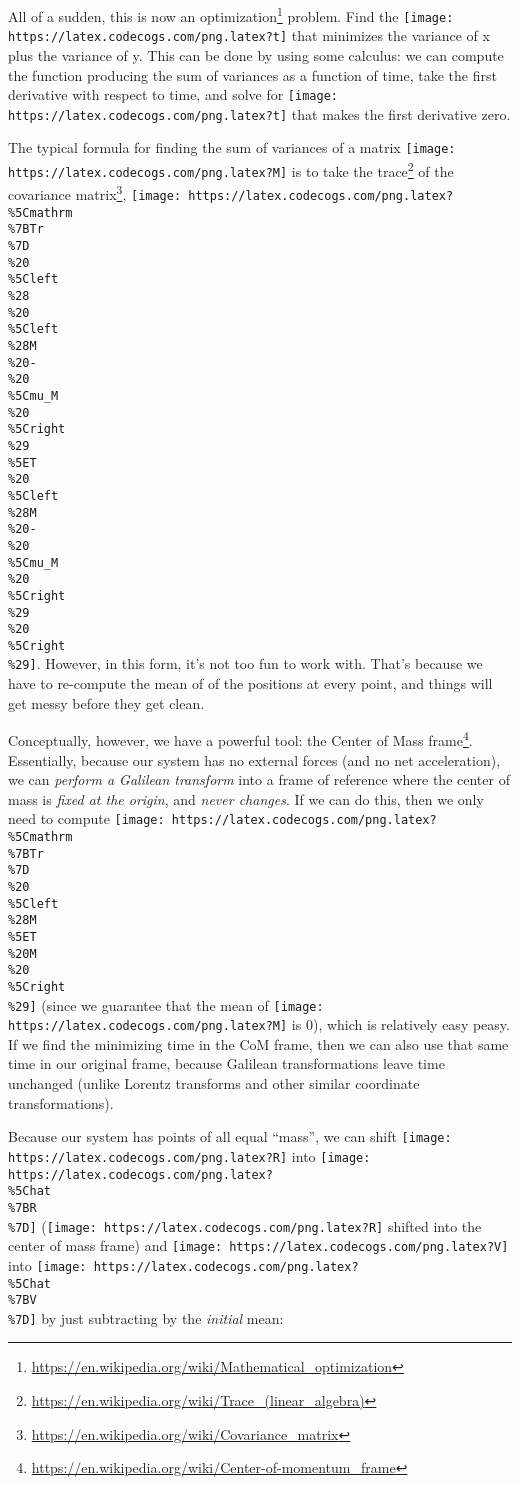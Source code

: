 \documentclass[]{article}
\renewcommand{\href}[2]{#2\footnote{\url{#1}}}
\begin{document}
All of a sudden, this is now an
\href{https://en.wikipedia.org/wiki/Mathematical_optimization}{optimization}
problem. Find the \texttt{[image: https://latex.codecogs.com/png.latex?t]} that
minimizes the variance of x plus the variance of y. This can be done by using
some calculus: we can compute the function producing the sum of variances as a
function of time, take the first derivative with respect to time, and solve for
\texttt{[image: https://latex.codecogs.com/png.latex?t]} that makes the first
derivative zero.

The typical formula for finding the sum of variances of a matrix
\texttt{[image: https://latex.codecogs.com/png.latex?M]} is to take the
\href{https://en.wikipedia.org/wiki/Trace_(linear_algebra)}{trace} of the
\href{https://en.wikipedia.org/wiki/Covariance_matrix}{covariance matrix},
\texttt{[image: https://latex.codecogs.com/png.latex?\\\%5Cmathrm\\\%7BTr\\\%7D\\\%20\\\%5Cleft\\\%28\\\%20\\\%5Cleft\\\%28M\\\%20-\\\%20\\\%5Cmu\_M\\\%20\\\%5Cright\\\%29\\\%5ET\\\%20\\\%5Cleft\\\%28M\\\%20-\\\%20\\\%5Cmu\_M\\\%20\\\%5Cright\\\%29\\\%20\\\%5Cright\\\%29]}.
However, in this form, it's not too fun to work with. That's because we have to
re-compute the mean of of the positions at every point, and things will get
messy before they get clean.

Conceptually, however, we have a powerful tool: the
\href{https://en.wikipedia.org/wiki/Center-of-momentum_frame}{Center of Mass
frame}. Essentially, because our system has no external forces (and no net
acceleration), we can \emph{perform a Galilean transform} into a frame of
reference where the center of mass is \emph{fixed at the origin}, and
\emph{never changes}. If we can do this, then we only need to compute
\texttt{[image: https://latex.codecogs.com/png.latex?\\\%5Cmathrm\\\%7BTr\\\%7D\\\%20\\\%5Cleft\\\%28M\\\%5ET\\\%20M\\\%20\\\%5Cright\\\%29]}
(since we guarantee that the mean of
\texttt{[image: https://latex.codecogs.com/png.latex?M]} is 0), which is
relatively easy peasy. If we find the minimizing time in the CoM frame, then we
can also use that same time in our original frame, because Galilean
transformations leave time unchanged (unlike Lorentz transforms and other
similar coordinate transformations).

Because our system has points of all equal ``mass'', we can shift
\texttt{[image: https://latex.codecogs.com/png.latex?R]} into
\texttt{[image: https://latex.codecogs.com/png.latex?\\\%5Chat\\\%7BR\\\%7D]}
(\texttt{[image: https://latex.codecogs.com/png.latex?R]} shifted into the
center of mass frame) and
\texttt{[image: https://latex.codecogs.com/png.latex?V]} into
\texttt{[image: https://latex.codecogs.com/png.latex?\\\%5Chat\\\%7BV\\\%7D]} by just
subtracting by the \emph{initial} mean:
\end{document}
